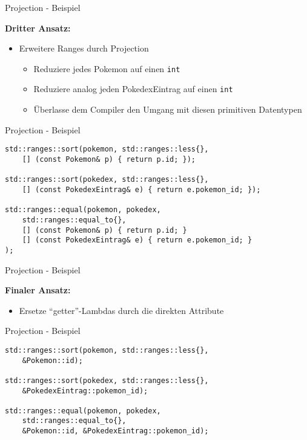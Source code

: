 \begin{frame}{Projection - Beispiel}
    \begin{center}
        \textbf{Dritter Ansatz:}
    \end{center}

    \begin{itemize}
        \item Erweitere Ranges durch Projection

              \begin{itemize}
                  \item Reduziere jedes Pokemon auf einen \texttt{int}
                  \item Reduziere analog jeden PokedexEintrag auf einen \texttt{int}
                  \item Überlasse dem Compiler den Umgang mit diesen primitiven Datentypen
              \end{itemize}
    \end{itemize}
\end{frame}

\begin{frame}[fragile]{Projection - Beispiel}
    \begin{verbatim}
std::ranges::sort(pokemon, std::ranges::less{},
    [] (const Pokemon& p) { return p.id; });

std::ranges::sort(pokedex, std::ranges::less{},
    [] (const PokedexEintrag& e) { return e.pokemon_id; });

std::ranges::equal(pokemon, pokedex,
    std::ranges::equal_to{},
    [] (const Pokemon& p) { return p.id; }
    [] (const PokedexEintrag& e) { return e.pokemon_id; }
);
    \end{verbatim}
\end{frame}

\begin{frame}{Projection - Beispiel}
    \begin{center}
        \textbf{Finaler Ansatz:}
    \end{center}

    \begin{itemize}
        \item Ersetze \enquote{getter}-Lambdas durch die direkten Attribute
    \end{itemize}
\end{frame}

\begin{frame}[fragile]{Projection - Beispiel}
    \begin{verbatim}
std::ranges::sort(pokemon, std::ranges::less{},
    &Pokemon::id);

std::ranges::sort(pokedex, std::ranges::less{},
    &PokedexEintrag::pokemon_id);

std::ranges::equal(pokemon, pokedex,
    std::ranges::equal_to{},
    &Pokemon::id, &PokedexEintrag::pokemon_id);
    \end{verbatim}
\end{frame}

